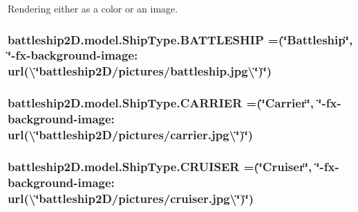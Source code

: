 Rendering either as a color or an image. 

\hypertarget{enumbattleship2D_1_1model_1_1ShipType_ab3cfa603543cb285e992850a6f7c954d}{
\subsubsection[{B\-A\-T\-T\-L\-E\-S\-H\-I\-P}]{\setlength{\rightskip}{0pt plus 5cm}battleship2\-D.\-model.\-Ship\-Type.\-B\-A\-T\-T\-L\-E\-S\-H\-I\-P =(\char`\"{}Battleship\char`\"{}, \char`\"{}-\/fx-\/background-\/image\-: url(\textbackslash{}\char`\"{}battleship2\-D/pictures/battleship.\-jpg\textbackslash{}\char`\"{})\char`\"{})}}\label{enumbattleship2D_1_1model_1_1ShipType_ab3cfa603543cb285e992850a6f7c954d}
\hypertarget{enumbattleship2D_1_1model_1_1ShipType_ab24d6f8e734fcdb708100c0ae4aaaf50}{
\subsubsection[{C\-A\-R\-R\-I\-E\-R}]{\setlength{\rightskip}{0pt plus 5cm}battleship2\-D.\-model.\-Ship\-Type.\-C\-A\-R\-R\-I\-E\-R =(\char`\"{}Carrier\char`\"{}, \char`\"{}-\/fx-\/background-\/image\-: url(\textbackslash{}\char`\"{}battleship2\-D/pictures/carrier.\-jpg\textbackslash{}\char`\"{})\char`\"{})}}\label{enumbattleship2D_1_1model_1_1ShipType_ab24d6f8e734fcdb708100c0ae4aaaf50}
\hypertarget{enumbattleship2D_1_1model_1_1ShipType_ae1b8a67f35620be66e722436cc116a03}{
\subsubsection[{C\-R\-U\-I\-S\-E\-R}]{\setlength{\rightskip}{0pt plus 5cm}battleship2\-D.\-model.\-Ship\-Type.\-C\-R\-U\-I\-S\-E\-R =(\char`\"{}Cruiser\char`\"{}, \char`\"{}-\/fx-\/background-\/image\-: url(\textbackslash{}\char`\"{}battleship2\-D/pictures/cruiser.\-jpg\textbackslash{}\char`\"{})\char`\"{})}}\label{enumbattleship2D_1_1model_1_1ShipType_ae1b8a67f35620be66e722436cc116a03}
